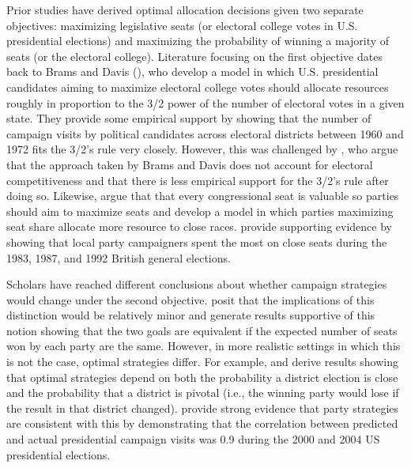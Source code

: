 \documentclass[12pt,final,fleqn]{article}
\theoremstyle{plain}
\begin{document}
Prior studies have derived optimal allocation decisions given two separate objectives: maximizing legislative seats (or electoral college votes in U.S. presidential elections) and maximizing the probability of winning a majority of seats (or the electoral college). Literature focusing on the first objective dates back to Brams and Davis (\citeyear{brams1973resource, brams19743}), who develop a model in which U.S. presidential candidates aiming to maximize electoral college votes should allocate resources roughly in proportion to the 3/2 power of the number of electoral votes in a given state. They provide some empirical support by showing that the number of campaign visits by political candidates across electoral districts between 1960 and 1972 fits the 3/2's rule very closely. However, this was challenged by \citet{colantoni1975campaign}, who argue that the approach taken by Brams and Davis does not account for electoral competitiveness and that there is less empirical support for the 3/2's rule after doing so. Likewise, \citet{jacobson1985party} argue that that every congressional seat is valuable so parties should aim to maximize seats and \citet{snyder1989election} develop a model in which parties maximizing seat share allocate more resource to close races. \citet{pattie1995winning} provide supporting evidence by showing that local party campaigners spent the most on close seats during the 1983, 1987, and 1992 British general elections.  

Scholars have reached different conclusions about whether campaign strategies would change under the second objective. \citet{brams1973resource} posit that the implications of this distinction would be relatively minor and \citet{aranson1974election} generate results supportive of this notion showing that the two goals are equivalent if the expected number of seats won by each party are the same. However, in more realistic settings in which this is not the case, optimal strategies differ. For example, \citet{snyder1989election} and \citet{stromberg2008electoral} derive results showing that optimal strategies depend on both the probability a district election is close and the probability that a district is pivotal (i.e., the winning party would lose if the result in that district changed). \citet{stromberg2008electoral} provide strong evidence that party strategies are consistent with this by demonstrating that the correlation between predicted and actual presidential campaign visits was 0.9 during the 2000 and 2004 US presidential elections.
\end{document}

